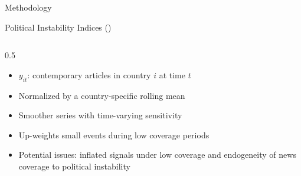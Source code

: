 \documentclass[aspectratio=169,10pt]{beamer}
\begin{document}
\begin{section}[Methodology]{Methodology}
\begin{frame}{Political Instability Indices (\cite{BARRETT2022})}
\begin{columns}[T,onlytextwidth]
\begin{column}{0.5\textwidth}
\begin{itemize}\setlength\itemsep{0.4em}
\item $y_{it}$: contemporary articles in country $i$ at time $t$
\item Normalized by a country-specific rolling mean
\item Smoother series with time-varying sensitivity
\item Up-weights small events during low coverage periods
\item Potential issues: inflated signals under low coverage and endogeneity of news coverage to political instability
\end{itemize}
\end{column}
\end{columns}
\end{frame}

\end{section}
\end{document}
